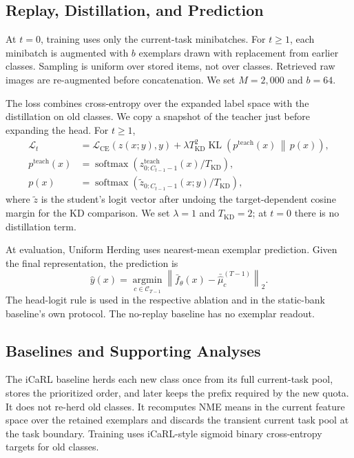 \subsection{Replay, Distillation, and Prediction}
\label{subsec:replay-distillation}

At $t=0$, training uses only the current-task minibatches.  For $t\ge1$, each
minibatch is augmented with $b$ exemplars drawn with replacement from
earlier classes.  Sampling is uniform over stored items, not over classes.
Retrieved raw images are re-augmented before concatenation.  We set
$M=2{,}000$ and $b=64$.

The loss combines cross-entropy over the expanded label space with the distillation
on old classes.  We copy a snapshot of the teacher just before expanding the head.
For $t\ge1$,
\[
\begin{aligned}
\mathcal{L}_t
&=\mathcal{L}_{\mathrm{CE}}(z(x;y),y)
+\lambda T_{\mathrm{KD}}^2
\operatorname{KL}\!\left(p^{\mathrm{teach}}(x)\,\middle\|\,p(x)\right),\\
p^{\mathrm{teach}}(x)
&=\operatorname{softmax}\!\left(
z^{\mathrm{teach}}_{0:C_{t-1}-1}(x)/T_{\mathrm{KD}}\right),\\
p(x)
&=\operatorname{softmax}\!\left(
\tilde z_{0:C_{t-1}-1}(x;y)/T_{\mathrm{KD}}\right),
\end{aligned}
\]
where $\tilde z$ is the student's logit vector after undoing the
target-dependent cosine margin for the KD comparison.  We set $\lambda=1$
and $T_{\mathrm{KD}}=2$; at $t=0$ there is no distillation term.

At evaluation, Uniform Herding uses nearest-mean exemplar prediction.  Given
the final representation, the prediction is
\[
\hat y(x)=\operatorname*{argmin}_{c\in\mathcal{C}_{T-1}}
\left\|\bar f_\theta(x)-\bar{\hat\mu}_c^{(T-1)}\right\|_2.
\]
The head-logit rule is used in the respective ablation and in the
static-bank baseline's own protocol.  The no-replay baseline has no exemplar
readout.

\subsection{Baselines and Supporting Analyses}
\label{subsec:baselines-supporting}

The iCaRL baseline herds each new class once from its full current-task
pool, stores the prioritized order, and later keeps the prefix required by the
new quota.  It does not re-herd old classes.  It recomputes NME means in
the current feature space over the retained exemplars and discards the
transient current task pool at the task boundary.  Training uses
iCaRL-style sigmoid binary cross-entropy targets for old classes.

